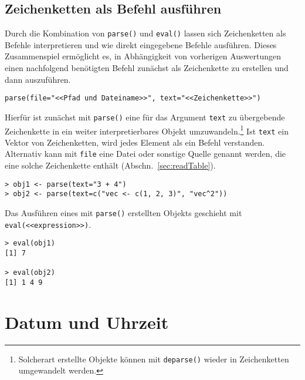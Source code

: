 \subsection{Zeichenketten als Befehl ausführen}

Durch die Kombination von \lstinline!parse()! und \lstinline!eval()! lassen sich Zeichenketten als Befehle interpretieren und wie direkt eingegebene Befehle ausführen. Dieses Zusammenspiel ermöglicht es, in Abhängigkeit von vorherigen Auswertungen einen nachfolgend benötigten Befehl zunächst als Zeichenkette zu erstellen und dann auszuführen.
\begin{lstlisting}
parse(file="<<Pfad und Dateiname>>", text="<<Zeichenkette>>")
\end{lstlisting}

Hierfür ist zunächst mit \lstinline!parse()! eine für das Argument \lstinline!text! zu übergebende Zeichenkette in ein weiter interpretierbares Objekt umzuwandeln.\footnote{Solcherart erstellte Objekte können mit \lstinline!deparse()! wieder in Zeichenketten umgewandelt werden.} Ist \lstinline!text! ein Vektor von Zeichenketten, wird jedes Element als ein Befehl verstanden. Alternativ kann mit \lstinline!file! eine Datei oder sonstige Quelle genannt werden, die eine solche Zeichenkette enthält (Abschn.\ \ref{sec:readTable}).
\begin{lstlisting}
> obj1 <- parse(text="3 + 4")
> obj2 <- parse(text=c("vec <- c(1, 2, 3)", "vec^2"))
\end{lstlisting}

Das Ausführen eines mit \lstinline!parse()! erstellten Objekts geschieht mit \lstinline!eval(<<expression>>)!.
\begin{lstlisting}
> eval(obj1)
[1] 7

> eval(obj2)
[1] 1 4 9
\end{lstlisting}

\section{Datum und Uhrzeit}
\label{sec:date}

